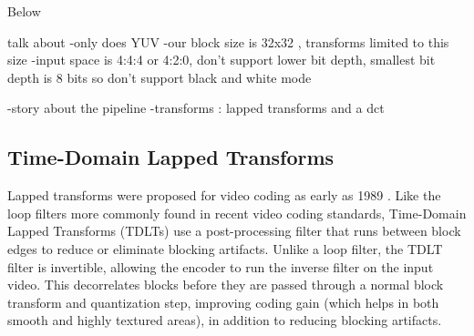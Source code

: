 \documentclass[conference, 10pt]{IEEEtran}
\begin{document}
Below

%
%
%


%

 talk about
 -only does YUV
 -our block size is 32x32 , transforms limited to this size
 -input space is 4:4:4 or 4:2:0, don't support lower bit depth, smallest bit depth is 8 bits so don't support black and white mode
 
 -story about the pipeline
 -transforms : lapped transforms and a dct
 






\subsection{Time-Domain Lapped Transforms}
\label{sec:tdlt}

Lapped transforms were proposed for video coding as early as 1989 \cite{journals/tsp/MalvarS89}.
Like the loop filters more commonly found in recent video coding standards,
 Time-Domain Lapped Transforms (TDLTs) use a post-processing filter that runs between block edges to reduce or
 eliminate blocking artifacts.
Unlike a loop filter, the TDLT filter is invertible, allowing the encoder to
 run the inverse filter on the input video.
This decorrelates blocks before they are passed through a normal block
 transform and quantization step, improving coding gain (which helps in both
 smooth and highly textured areas), in addition to reducing blocking artifacts.
\end{document}
